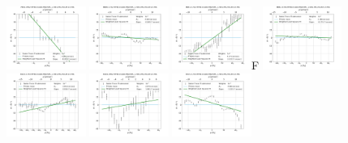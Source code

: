 \documentclass[fleqn,usenatbib]{mnras}
\begin{document}
\begin{figure}
    \centering
    \includegraphics[width=0.23\textwidth]{Images/WLSFITS/CPSB/7964-1902.png}
    \includegraphics[width=0.23\textwidth]{Images/WLSFITS/CPSB/8080-3702.png}
    \includegraphics[width=0.23\textwidth]{Images/WLSFITS/CPSB/8081-3702.png}F
    \includegraphics[width=0.23\textwidth]{Images/WLSFITS/CPSB/8082-3704.png}
    \includegraphics[width=0.23\textwidth]{Images/WLSFITS/CPSB/8143-3703.png}
    \includegraphics[width=0.23\textwidth]{Images/WLSFITS/CPSB/8144-1902.png}
    \includegraphics[width=0.23\textwidth]{Images/WLSFITS/CPSB/8315-3703.png}

\end{figure}
\end{document}
